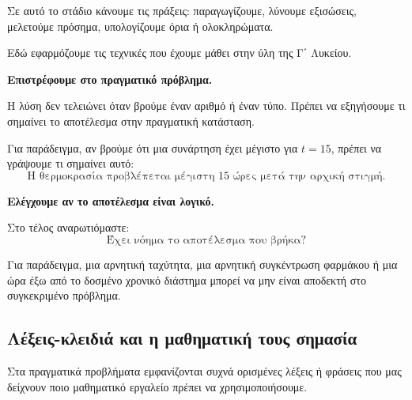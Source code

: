 \begin{alist}
Σε αυτό το στάδιο κάνουμε τις πράξεις: παραγωγίζουμε, λύνουμε εξισώσεις, μελετούμε πρόσημα, υπολογίζουμε όρια ή ολοκληρώματα.

Εδώ εφαρμόζουμε τις τεχνικές που έχουμε μάθει στην ύλη της Γ΄ Λυκείου.

\item \textbf{Επιστρέφουμε στο πραγματικό πρόβλημα.}

Η λύση δεν τελειώνει όταν βρούμε έναν αριθμό ή έναν τύπο. Πρέπει να εξηγήσουμε τι σημαίνει το αποτέλεσμα στην πραγματική κατάσταση.

Για παράδειγμα, αν βρούμε ότι μια συνάρτηση έχει μέγιστο για \(t=15\), πρέπει να γράψουμε τι σημαίνει αυτό:
\[
\text{Η θερμοκρασία προβλέπεται μέγιστη } 15 \text{ ώρες μετά την αρχική στιγμή.}
\]

\item \textbf{Ελέγχουμε αν το αποτέλεσμα είναι λογικό.}

Στο τέλος αναρωτιόμαστε:
\[
\text{Έχει νόημα το αποτέλεσμα που βρήκα?}
\]

Για παράδειγμα, μια αρνητική ταχύτητα, μια αρνητική συγκέντρωση φαρμάκου ή μια ώρα έξω από το δοσμένο χρονικό διάστημα μπορεί να μην είναι αποδεκτή στο συγκεκριμένο πρόβλημα.
\end{alist}

\subsection{Λέξεις-κλειδιά και η μαθηματική τους σημασία}

Στα πραγματικά προβλήματα εμφανίζονται συχνά ορισμένες λέξεις ή φράσεις που μας δείχνουν ποιο μαθηματικό εργαλείο πρέπει να χρησιμοποιήσουμε.

